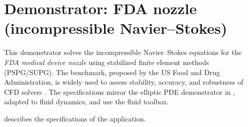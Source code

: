 
\section{Demonstrator: FDA nozzle (incompressible Navier--Stokes)}
\label{sec:app:specs:app-feelpp-discr-2}

This demonstrator solves the incompressible Navier--Stokes equations for the \emph{FDA medical device nozzle} using stabilized finite element methods (PSPG/SUPG). The benchmark, proposed by the US Food and Drug Administration, is widely used to assess stability, accuracy, and robustness of CFD solvers \cite{hariharan_multilaboratory_2011,stewart_assessment_2012}. The specifications mirror the elliptic PDE demonstrator in , adapted to fluid dynamics, and use the \Feelpp fluid toolbox.

 describes the specifications of the application.

